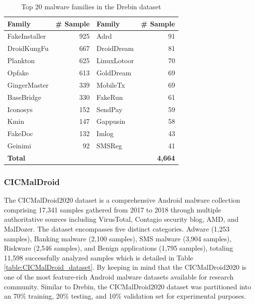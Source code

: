 \documentclass[runningheads]{llncs}
\begin{document}
\begin{table}[h]
\centering
\caption{Top 20 malware families in the Drebin dataset}
\begin{tabular}{l r @{\hskip 1.0em}|@{\hskip 1.0em} l r}
\toprule
\textbf{Family} & \textbf{\# Sample} & \textbf{Family} & \textbf{\# Sample} \\
\midrule
FakeInstaller & 925 & Adrd & 91 \\
DroidKungFu   & 667 & DroidDream    & 81 \\
Plankton      & 625 & LinuxLotoor   & 70 \\
Opfake        & 613 & GoldDream     & 69 \\
GingerMaster  & 339 & MobileTx      & 69 \\
BaseBridge    & 330 & FakeRun       & 61 \\
Iconosys      & 152 & SendPay       & 59 \\
Kmin          & 147 & Gappusin      & 58 \\
FakeDoc       & 132 & Imlog         & 43 \\
Geinimi       & 92  & SMSReg        & 41 \\
\midrule
\multicolumn{2}{l}{\textbf{Total}} & \multicolumn{2}{r}{\textbf{4,664}} \\
\bottomrule
\end{tabular}
\label{table:derbin_dataset}
\end{table}


\subsubsection{CICMalDroid}
The CICMalDroid2020 dataset is a comprehensive Android malware collection comprising 17,341 samples gathered from 2017 to 2018 through multiple authoritative sources including VirusTotal, Contagio security blog, AMD, and MalDozer. The dataset encompasses five distinct categories. Adware (1,253 samples), Banking malware (2,100 samples), SMS malware (3,904 samples), Riskware (2,546 samples), and Benign applications (1,795 samples), totaling 11,598 successfully analyzed samples which is detailed in Table \ref{table:CICMalDroid_dataset}. By keeping in mind that the CICMalDroid2020 is one of the most feature-rich Android malware datasets available for research community. Similar to Drebin, the CICMalDroid2020 dataset was partitioned into an 70\% training, 20\% testing, and 10\% validation set for experimental purposes.
\end{document}
